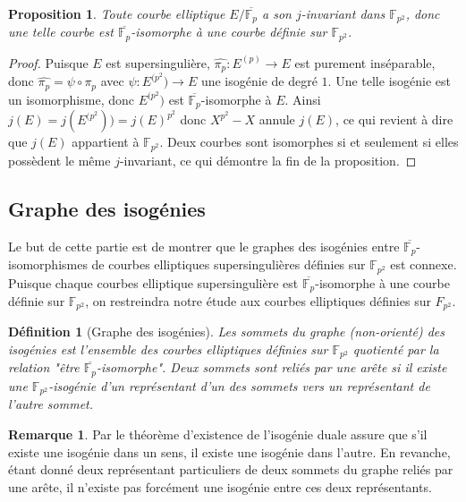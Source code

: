 \documentclass{article}
\theoremstyle{plain}%
\newtheorem{prop}[thm]{Proposition}
\newtheorem{deff}[thm]{Définition}
\theoremstyle{definition}%
\newtheorem{rem}[thm]{Remarque}
\newcommand{\F}{\mathbb{F}}
\newcommand{\h}{\widehat}
\newcommand{\ol}{\overline}
\begin{document}
\begin{prop}
  \label{j-p2}
  Toute courbe elliptique $E/\overline{\F_p}$ a son $j$-invariant dans $\F_{p^2}$, donc une telle courbe est $\overline{\F_p}$-isomorphe à une courbe définie sur $\F_{p^2}$. 
\end{prop}

\begin{proof}
  Puisque $E$ est supersingulière, $\h{\pi_p} : E^{(p)} \to  E$ est purement inséparable, donc $\h{\pi_p} = \psi \circ \pi_p$ avec $\psi : E^{(p^2}) \to E$ une isogénie de degré $1$. Une telle isogénie est un isomorphisme, donc $ E^{(p^2}) $ est $\ol{\F_p}$-isomorphe à $E$. Ainsi $j(E) = j( E^{(p^2}) ) = j(E)^{p^2}$ donc $X^{p^2} - X$ annule $j(E)$, ce qui revient à dire que $j(E)$ appartient à $\F_{p^2}$.
Deux courbes sont isomorphes si et seulement si elles possèdent le même $j$-invariant, ce qui démontre la fin de la proposition.
\end{proof}

\subsection{Graphe des isogénies}

Le but de cette partie est de montrer que le graphes des isogénies entre $\overline{\F_p}$-isomorphismes de courbes elliptiques supersingulières définies sur $\F_{p^2}$ est connexe. Puisque chaque courbes elliptique supersingulière est $\ol{\F_p}$-isomorphe à une courbe définie sur $\F_{p^2}$, on restreindra notre étude aux courbes elliptiques définies sur $F_{p^2}$.


\begin{deff}[Graphe des isogénies]
  Les sommets du graphe (non-orienté) des isogénies est l'ensemble des courbes elliptiques définies sur $\F_{p^2}$ quotienté par la relation "être $\ol{\F_p}$-isomorphe". Deux sommets sont reliés par une arête si il existe une $\F_{p^2}$-isogénie d'un représentant d'un des sommets vers un représentant de l'autre sommet.
\end{deff}

\begin{rem}
  Par le théorème d'existence de l'isogénie duale assure que s'il existe une isogénie dans un sens, il existe une isogénie dans l'autre. En revanche, étant donné deux représentant particuliers de deux sommets du graphe reliés par une arête, il n'existe pas forcément une isogénie entre ces deux représentants.
\end{rem}
\end{document}

